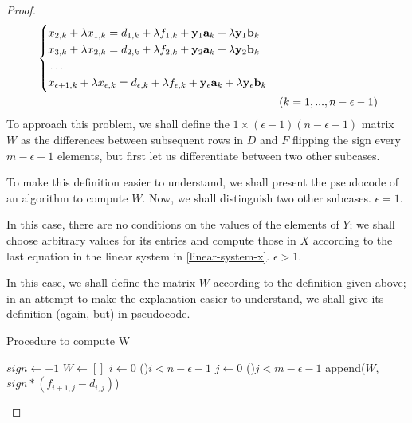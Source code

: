 \begin{cs}
\begin{proof}
\begin{equation}
            \begin{aligned}
            & \left\{
                \begin{aligned}
                    & x_{2, k} + \lambda x_{1, k} = d_{1, k} + \lambda f_{1, k} + \vb{y}_{1}\vb{a}_{k} +
                        \lambda \vb{y}_{1}\vb{b}_{k} \\
                    & x_{3, k} + \lambda x_{2, k} = d_{2, k} + \lambda f_{2, k} + \vb{y}_{2}\vb{a}_{k} +
                        \lambda \vb{y}_{2}\vb{b}_{k} \\
                    & \hdots \\
                    & x_{\epsilon+1, k} + \lambda x_{\epsilon, k} =
                        d_{\epsilon, k} + \lambda f_{\epsilon, k} + \vb{y}_{\epsilon}\vb{a}_{k} +
                        \lambda \vb{y}_{\epsilon}\vb{b}_{k} \\
                \end{aligned}
            \right. \\
            & & (k = 1, ..., n - \epsilon - 1)
        \end{aligned}
        \end{equation}
        To approach this problem, we shall define the \(1 \times (\epsilon - 1)(n - \epsilon - 1)\) matrix \(W\) as the differences between
        subsequent rows in \(D\) and \(F\) flipping the sign every \(m - \epsilon - 1\) elements, but first let us
        differentiate between two other subcases.
        
        To make this definition easier to understand, we shall present the pseudocode of an algorithm to compute \(W\).
        Now, we shall distinguish two other subcases.
        \subcase \(\epsilon = 1.\)

            In this case, there are no conditions on the values of the elements of \(Y\); we shall choose arbitrary values
            for its entries and compute those in \(X\) according to the last equation in the linear
            system in \eqref{linear-system-x}.
        \subcase \(\epsilon > 1.\)

        In this case, we shall define the matrix \(W\) according to the definition given above; in an attempt to make
        the explanation easier to understand, we shall give its definition (again, but) in pseudocode.

        \begin{algorithm*}
            \caption{Procedure to compute W}
            $sign \gets -1$\;
            $W \gets []$\;
            $i \gets 0$\;
            \For(){$i < n - \epsilon - 1$}{
                $j \gets 0$\;
                \For(){$j < m - \epsilon - 1$}{
                    append($W$, $sign * (f_{i+1, j} - d_{i, j})$)\;
                }
            }
        \end{algorithm*}


\end{proof}
\end{cs}
